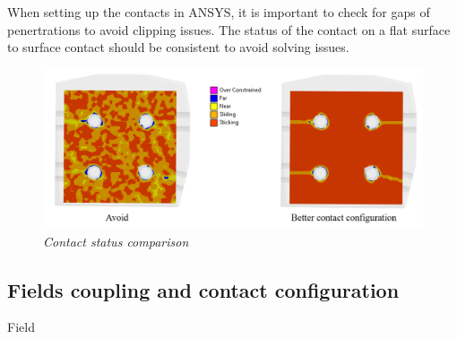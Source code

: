 \\
\break
\normalsize{\indent When setting up the contacts in ANSYS\textsuperscript{\textregistered}, it is important to check for gaps of penertrations to avoid clipping issues. The status of the contact on a flat surface to surface contact should be consistent to avoid solving issues.}
\begin{figure}[h!]
  \label{fig_4_1_0} 
  \centering
  \includegraphics[width=1\textwidth]{figures/wonrgvsrightcs.png}
  \caption{\it Contact status comparison}
\end{figure}
\normalsize{}
\subsection{Fields coupling and contact configuration}
\normalsize{Field}